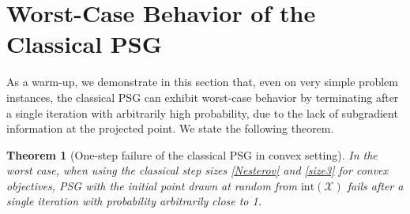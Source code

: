 \documentclass[sn-mathphys]{JORSC-jnl}%
\theoremstyle{thmstyleone}%
\newtheorem{theorem}{Theorem}[section]%
\theoremstyle{thmstylethree}%
\begin{document}
\section{Worst-Case Behavior of the Classical PSG}
As a warm-up, we demonstrate in this section that, even on very simple problem instances, the classical PSG can exhibit worst-case behavior by terminating after a single iteration with arbitrarily high probability, due to the lack of subgradient information at the projected point. We state the following theorem.
\vspace{-3mm}
\begin{theorem}[One-step failure of the classical PSG in convex setting]\label{thm2.1}
	In the worst case, when using the classical step sizes \eqref{Nesterov} and \eqref{size3} for convex objectives, PSG with the initial point drawn at random from $\text{int}(\mathcal{X})$ fails after a single iteration with probability arbitrarily close to 1.
\end{theorem}
\end{document}
